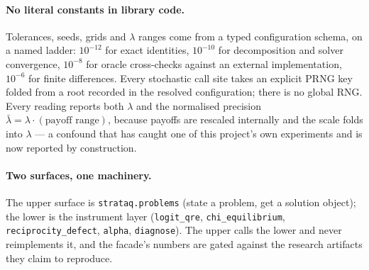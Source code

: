 \paragraph{No literal constants in library code.} Tolerances, seeds, grids and
$\lambda$ ranges come from a typed configuration schema, on a named ladder:
$10^{-12}$ for exact identities, $10^{-10}$ for decomposition and solver
convergence, $10^{-8}$ for oracle cross-checks against an external
implementation, $10^{-6}$ for finite differences. Every stochastic call site
takes an explicit PRNG key folded from a root recorded in the resolved
configuration; there is no global RNG. Every reading reports both $\lambda$ and
the normalised precision $\bar\lambda=\lambda\cdot(\text{payoff range})$, because
payoffs are rescaled internally and the scale folds into $\lambda$ --- a confound
that has caught one of this project's own experiments and is now reported by
construction.

\paragraph{Two surfaces, one machinery.} The upper surface is
\texttt{strataq.problems} (state a problem, get a solution object); the lower is
the instrument layer (\texttt{logit\_qre}, \texttt{chi\_equilibrium},
\texttt{reciprocity\_defect}, \texttt{alpha}, \texttt{diagnose}). The upper calls
the lower and never reimplements it, and the facade's numbers are gated against
the research artifacts they claim to reproduce.
